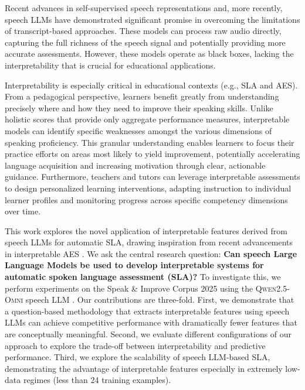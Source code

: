 \documentclass{report}
\begin{document}
Recent advances in self-supervised speech representations \citep{bannò2022proficiencyassessmentl2spoken,bannò2022l2proficiencyassessmentusing,mcknight_civelekoglu_gales_banno_liusie_knill_2023} and, more recently, speech LLMs \citep{ma2025assessment} have demonstrated significant promise in overcoming the limitations of transcript-based approaches. These models can process raw audio directly, capturing the full richness of the speech signal and potentially providing more accurate assessments. However, these models operate as black boxes, lacking the interpretability that is crucial for educational applications.

Interpretability is especially critical in educational contexts (e.g., SLA and AES). From a pedagogical perspective, learners benefit greatly from understanding precisely where and how they need to improve their speaking skills. Unlike holistic scores that provide only aggregate performance measures, interpretable models can identify specific weaknesses amongst the various dimensions of speaking proficiency. This granular understanding enables learners to focus their practice efforts on areas most likely to yield improvement, potentially accelerating language acquisition and increasing motivation through clear, actionable guidance. Furthermore, teachers and tutors can leverage interpretable assessments to design personalized learning interventions, adapting instruction to individual learner profiles and monitoring progress across specific competency dimensions over time.

This work explores the novel application of interpretable features derived from speech LLMs for automatic SLA, drawing inspiration from recent advancements in interpretable AES \citep{eltanbouly2025tratestraitspecificrubricassistedcrossprompt}. We ask the central research question: \textbf{Can speech Large Language Models be used to develop interpretable systems for automatic spoken language assessment (SLA)?} To investigate this, we perform experiments on the Speak \& Improve Corpus 2025 \citep{knill2024sandi} using the \textsc{Qwen2.5-Omni} speech LLM \citep{xu2025qwen25omnitechnicalreport}. Our contributions are three-fold. First, we demonstrate that a question-based methodology that extracts interpretable features using speech LLMs can achieve competitive performance with dramatically fewer features that are conceptually meaningful. Second, we evaluate different configurations of our approach to explore the trade-off between interpretability and predictive performance. Third, we explore the scalability of speech LLM-based SLA, demonstrating the advantage of interpretable features especially in extremely low-data regimes (less than 24 training examples).
\end{document}
